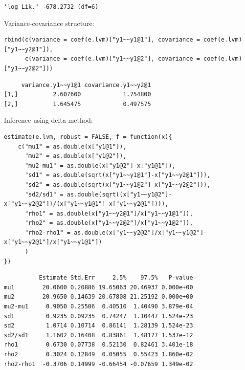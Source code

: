 \documentclass{article}
\begin{document}
\begin{verbatim}
'log Lik.' -678.2732 (df=6)
\end{verbatim}

Variance-covariance structure:
\lstset{language=r,label= ,caption= ,captionpos=b,numbers=none}
\begin{lstlisting}
rbind(c(variance = coef(e.lvm)["y1~~y1@1"], covariance = coef(e.lvm)["y1~~y2@1"]),
      c(variance = coef(e.lvm)["y1~~y1@2"], covariance = coef(e.lvm)["y1~~y2@2"]))
\end{lstlisting}

\begin{verbatim}
     variance.y1~~y1@1 covariance.y1~~y2@1
[1,]          2.607600            1.754800
[2,]          1.645475            0.497575
\end{verbatim}

Inference using delta-method:
\lstset{language=r,label= ,caption= ,captionpos=b,numbers=none}
\begin{lstlisting}
estimate(e.lvm, robust = FALSE, f = function(x){
    c("mu1" = as.double(x["y1@1"]),
      "mu2" = as.double(x["y1@2"]),
      "mu2-mu1" = as.double(x["y1@2"]-x["y1@1"]),
      "sd1" = as.double(sqrt(x["y1~~y1@1"]-x["y1~~y2@1"])),
      "sd2" = as.double(sqrt(x["y1~~y1@2"]-x["y1~~y2@2"])),
      "sd2/sd1" = as.double(sqrt((x["y1~~y1@2"]-x["y1~~y2@2"])/(x["y1~~y1@1"]-x["y1~~y2@1"]))),
      "rho1" = as.double(x["y1~~y2@1"]/x["y1~~y1@1"]),
      "rho2" = as.double(x["y1~~y2@2"]/x["y1~~y1@2"]),
      "rho2-rho1" = as.double(x["y1~~y2@2"]/x["y1~~y1@2"]-x["y1~~y2@1"]/x["y1~~y1@1"])
      )
})
\end{lstlisting}

\begin{verbatim}
          Estimate Std.Err     2.5%    97.5%   P-value
mu1        20.0600 0.20886 19.65063 20.46937 0.000e+00
mu2        20.9650 0.14639 20.67808 21.25192 0.000e+00
mu2-mu1     0.9050 0.25506  0.40510  1.40490 3.879e-04
sd1         0.9235 0.09235  0.74247  1.10447 1.524e-23
sd2         1.0714 0.10714  0.86141  1.28139 1.524e-23
sd2/sd1     1.1602 0.16408  0.83861  1.48177 1.537e-12
rho1        0.6730 0.07738  0.52130  0.82461 3.401e-18
rho2        0.3024 0.12849  0.05055  0.55423 1.860e-02
rho2-rho1  -0.3706 0.14999 -0.66454 -0.07659 1.349e-02
\end{verbatim}
\end{document}
